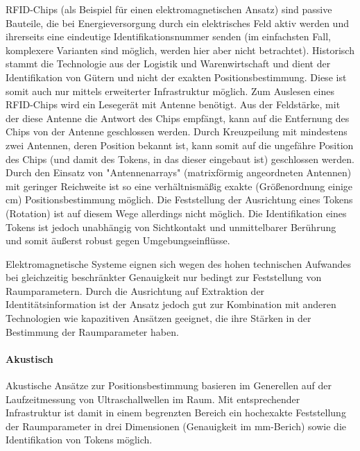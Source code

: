 RFID-Chips (als Beispiel für einen elektromagnetischen Ansatz) sind passive Bauteile, die bei Energieversorgung durch ein elektrisches Feld aktiv werden und ihrerseits eine eindeutige Identifikationsnummer senden (im einfachsten Fall, komplexere Varianten sind möglich, werden hier aber nicht betrachtet). Historisch stammt die Technologie aus der Logistik und Warenwirtschaft und dient der Identifikation von Gütern und nicht der exakten Positionsbestimmung. Diese ist somit auch nur mittels erweiterter Infrastruktur möglich. Zum Auslesen eines RFID-Chips wird ein Lesegerät mit Antenne benötigt. Aus der Feldstärke, mit der diese Antenne die Antwort des Chips empfängt, kann auf die Entfernung des Chips von der Antenne geschlossen werden. Durch Kreuzpeilung mit mindestens zwei Antennen, deren Position bekannt ist, kann somit auf die ungefähre Position des Chips (und damit des Tokens, in das dieser eingebaut ist) geschlossen werden. Durch den Einsatz von "Antennenarrays" (matrixförmig angeordneten Antennen) mit geringer Reichweite ist so eine verhältnismäßig exakte (Größenordnung einige cm) Positionsbestimmung möglich. Die Feststellung der Ausrichtung eines Tokens (Rotation) ist auf diesem Wege allerdings nicht möglich. Die Identifikation eines Tokens ist jedoch unabhängig von Sichtkontakt und unmittelbarer Berührung und somit äußerst robust gegen Umgebungseinflüsse.

Elektromagnetische Systeme eignen sich wegen des hohen technischen Aufwandes bei gleichzeitig beschränkter Genauigkeit nur bedingt zur Feststellung von Raumparametern. Durch die Ausrichtung auf Extraktion der Identitätsinformation ist der Ansatz jedoch gut zur Kombination mit anderen Technologien wie kapazitiven Ansätzen geeignet, die ihre Stärken in der Bestimmung der Raumparameter haben.
 

\paragraph{Akustisch} %
\label{par:akustisch}

Akustische Ansätze zur Positionsbestimmung basieren im Generellen auf der Laufzeitmessung von Ultraschallwellen im Raum. Mit entsprechender Infrastruktur ist damit in einem begrenzten Bereich ein hochexakte Feststellung der Raumparameter in drei Dimensionen (Genauigkeit im mm-Berich) sowie die Identifikation von Tokens möglich.

